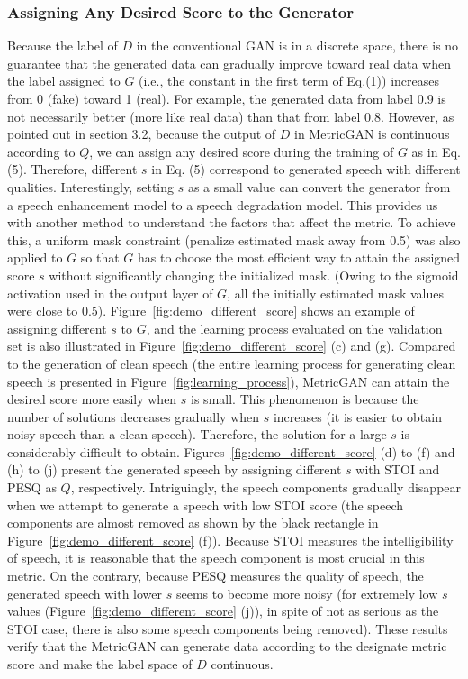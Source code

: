 \documentclass{article}
\begin{document}
\subsubsection{Assigning Any Desired Score to the Generator}
Because the label of $D$ in the conventional GAN is in a discrete space, there is no guarantee that the generated data can gradually improve toward real data when the label assigned to $G$ (i.e., the constant in the first term of Eq.(1)) increases  from 0 (fake) toward 1 (real). For example, the generated data from label 0.9 is not necessarily better (more like real data) than that from label 0.8.
However, as pointed out in section 3.2, because the output of $D$ in MetricGAN is continuous according to $Q$, we can assign any desired score during the training of $G$ as in Eq. (5). Therefore, different $s$ in Eq. (5) correspond to generated speech with different qualities. Interestingly, setting $s$ as a small value can convert the generator from a speech enhancement model to a speech degradation model. This provides us with another method to understand the factors that affect the metric. To achieve this, a uniform mask constraint (penalize estimated mask away from 0.5) was also applied to $G$ so that $G$ has to choose the most efficient way to attain the assigned score $s$ without significantly changing the initialized mask. (Owing to the sigmoid activation used in the output layer of $G$, all the initially estimated mask values were close to 0.5). Figure~\ref{fig:demo_different_score} shows an example of assigning different $s$ to $G$, and the learning process evaluated on the validation set is also illustrated in Figure~\ref{fig:demo_different_score} (c) and (g). Compared to the generation of clean speech (the entire learning process for generating clean speech is presented in Figure~\ref{fig:learning_process}), MetricGAN can attain the desired score more easily when $s$ is small. This phenomenon is because the number of solutions decreases gradually when $s$ increases (it is easier to obtain noisy speech than a clean speech). Therefore, the solution for a large $s$ is considerably difficult to obtain. Figures~\ref{fig:demo_different_score} (d) to (f) and (h) to (j) present the generated speech by assigning different $s$ with STOI and PESQ as $Q$, respectively. Intriguingly, the speech components gradually disappear when we attempt to generate a speech with low STOI score (the speech components are almost removed as shown by the black rectangle in Figure~\ref{fig:demo_different_score} (f)). Because STOI measures the intelligibility of speech, it is reasonable that the speech component is most crucial in this metric. On the contrary, because PESQ measures the quality of speech, the generated speech with lower $s$ seems to become more noisy (for extremely low $s$ values (Figure~\ref{fig:demo_different_score} (j)), in spite of not as serious as the STOI case, there is also some speech components being removed). These results verify that the MetricGAN can generate data according to the designate metric score and make the label space of $D$ continuous.
\end{document}
